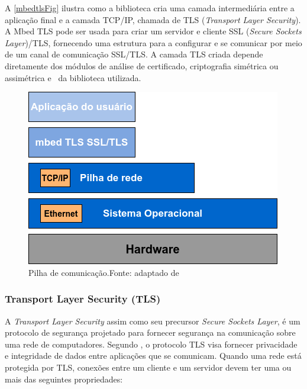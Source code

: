 A \autoref{mbedtlsFig} ilustra como a biblioteca cria uma camada intermediária entre a aplicação final e a camada TCP/IP, chamada de TLS (\textit{Transport Layer Security}). A Mbed TLS pode ser usada para criar um servidor e cliente SSL (\textit{Secure Sockets Layer})/TLS, fornecendo uma estrutura para a configurar e se comunicar por meio de um canal de comunicação SSL/TLS. A camada TLS criada depende diretamente dos módulos de análise de certificado, criptografia simétrica ou assimétrica e \hash\ da biblioteca utilizada.

\begin{figure}[H]
    \scriptsize
     \centering
     \includegraphics[scale=0.6]{dados/figuras/mbedtls.png}
     \caption{Pilha de comunicação.\newline Fonte: adaptado de \cite{mbedtls}}
     \label{mbedtlsFig}
\end{figure}



\subsubsection{Transport Layer Security (TLS)}

A \textit{Transport Layer Security} assim como seu precursor \textit{Secure Sockets Layer}, é um protocolo de segurança projetado para fornecer segurança na comunicação sobre uma rede de computadores.
Segundo , o protocolo TLS visa fornecer privacidade e integridade de dados entre aplicações que se comunicam. Quando uma rede está protegida por TLS, conexões entre um cliente e um servidor devem ter uma ou mais das seguintes propriedades:

